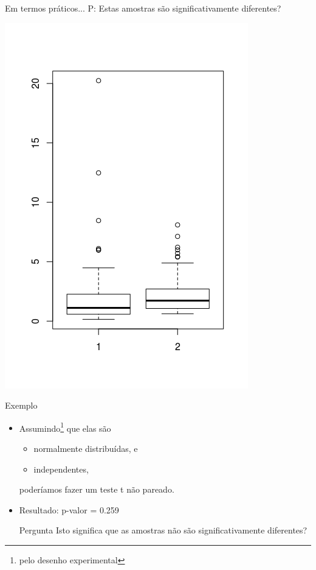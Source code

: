\documentclass{beamer}
\begin{document}
\begin{frame}{Em termos práticos...}
P: Estas amostras são significativamente diferentes?

  \centering
  \includegraphics[height=\textheight]{Cap37-38/2samples-bp}
\end{frame}

\begin{frame}{Exemplo}
  \begin{itemize}
  \item<1-> Assumindo\footnote{pelo desenho experimental} que elas são
    \begin{itemize}
    \item<1-> \alert<3>{normalmente distribuídas}, e
    \item<1-> independentes,
    \end{itemize}
    poderíamos fazer um teste t não pareado.

    \bigskip
    \bigskip
  \item<2-> Resultado: p-valor = \alert{0.259}
    \bigskip
    \bigskip
    \begin{exampleblock}{Pergunta}
      \small
      Isto significa que as amostras não são significativamente diferentes?
    \end{exampleblock}
  \end{itemize}
\end{frame}
\end{document}
